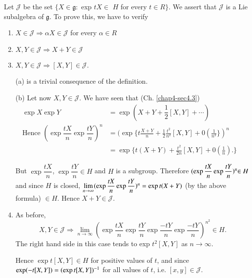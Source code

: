 Let $\mathscr{J}$ be the set $\{ X \in \mathfrak{g}:$ exp $t X \in$ $H$
for every $t \in R\}$. We assert that $\mathscr{J}$ is a Lie
subalgebra of $\mathfrak{g}$. To prove this, we have to verify  
\begin{enumerate}
\renewcommand{\theenumi}{\roman{enumi}}
\renewcommand{\labelenumi}{(\theenumi)}
\item  $ X \in \mathscr{J}  \Rightarrow \alpha X \in \mathscr{J}$ for
  every $\alpha \in R$ 

\item  $X,Y \in  \mathscr{J} \Rightarrow X + Y \in \mathscr{J}$ 

\item $X, Y \in \mathscr{J} \Rightarrow [X, Y] \in \mathscr{J}$.

(a) is a trivial consequence of the definition.

(b)  Let now $ X,Y \in \mathscr{J}$. We have seen that (Ch. \ref{chap4-sec4.3})
\begin{align*}
  \exp  X \exp  Y  & = \exp  (X+Y
  +\dfrac{1}{2}[X,Y]+ \cdots)\\ 
\text{Hence }  (\exp \dfrac{t X}{n} \exp
\dfrac{tY}{n})^n & =(\exp  \{t\frac
      {X+Y}{n}+\frac{1}{2}\frac{t^2}{n^2}[X,Y]+0(\frac{1}{n^2}\})^n
      \qquad \\ 
&  = \exp \big\{t(X+Y)+\frac{t^2}{2n}[X,Y]+0(\frac{1}{n}).\big\}
\end{align*}


But  $\exp \dfrac{tX}{n}$, $\exp \dfrac{tY}{n}\in  H$ and $H$ is a
subgroup. Therefore $(\exp \dfrac{tX}{n}\break\exp \dfrac{tY}{n})^{n}{\in
  H}$ and since $H$ is closed, $\lim\limits_{n \rightarrow \infty}
(\exp \dfrac{tX}{n} \exp \dfrac{tY}{n})^n=\break\exp t(X + Y)$ (by the above
formula) $\in H$. Hence $X + Y \in \mathscr{J}$. 
 

\item As before, 
$$X,Y \in \mathscr{J} \Rightarrow \lim\limits_{n
  \rightarrow \infty} (\exp \dfrac{tX}{n} \exp \dfrac{tY}{n}\exp
  \dfrac{-tY}{n} \exp \dfrac{-tY}{n})^{n^{2}}\in H.$$
The right hand side in this case tends to exp $t^2[X,Y]$ as $n
\rightarrow \infty$.  

Hence $\exp t [X,Y] \in H$  for positive values of $t$, and since
$\exp(-t\break[X,Y])= (\exp t [X,Y])^{-1}$ for all values of $t$, i.e. $[x,y]
\in \mathscr{J}$. 
\end{enumerate}

